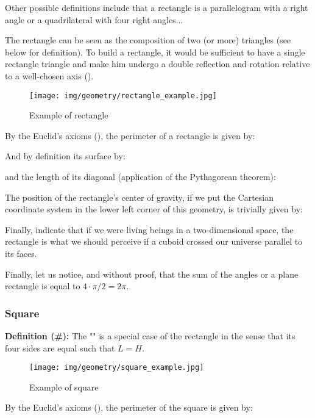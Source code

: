 {	Other possible definitions include that a rectangle is a parallelogram with a right angle or a quadrilateral with four right angles...
	
	\begin{tcolorbox}[title=Remark,colframe=black,arc=10pt]
	The rectangle can be seen as the composition of two (or more) triangles (see below for definition). To build a rectangle, it would be sufficient to have a single rectangle triangle and make him undergo a double reflection and rotation relative to a well-chosen axis ().
	\end{tcolorbox}
	
	\begin{figure}[H]
		\centering
		\texttt{[image: img/geometry/rectangle\_example.jpg]}
		\caption{Example of rectangle}
	\end{figure}
	By the Euclid's axioms (), the perimeter of a rectangle is given by:
	
	And by definition its surface by:
	
	and the length of its  diagonal (application of the Pythagorean theorem):
	
	The position of the rectangle's center of gravity, if we put the Cartesian coordinate system in the lower left corner of this geometry, is trivially given by:
	
	Finally, indicate that if we were living beings in a two-dimensional space, the rectangle is what we should perceive if a cuboid crossed our universe parallel to its faces.
	
	Finally, let us notice, and without proof, that the sum of the angles or a plane rectangle is equal to $4\cdot \pi/2=2\pi$.
	
	\subsubsection{Square}
	\textbf{Definition (\#\mydef):} The "" is a special case of the rectangle in the sense that its four sides are equal such that $L=H$.
	\begin{figure}[H]
		\centering
		\texttt{[image: img/geometry/square\_example.jpg]}
		\caption{Example of square}
	\end{figure}
	By the Euclid's axioms (), the perimeter of the square is given by:
	
}
